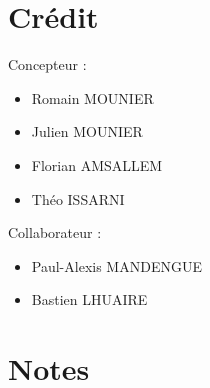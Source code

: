 \documentclass[12pt,a4paper]{article}
\begin{document}
\pagebreak

\section{Cr\'{e}dit}
Concepteur :
\begin{itemize}
\item Romain MOUNIER
\item Julien MOUNIER
\item Florian AMSALLEM
\item Théo ISSARNI
\end{itemize}

Collaborateur : 
\begin{itemize}
\item Paul-Alexis MANDENGUE
\item Bastien LHUAIRE
\end{itemize}
\pagebreak

\section{Notes}
\end{document}
